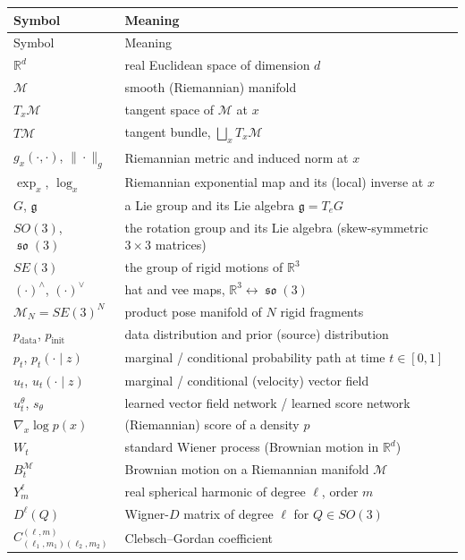 \documentclass[11pt,a4paper]{report}
\theoremstyle{definition}
\theoremstyle{remark}
\DeclareMathOperator{\so}{\mathfrak{so}}
\newcommand{\RR}{\mathbb R}
\begin{document}
\begin{center}
\begin{longtable}{p{3.6cm}p{10.5cm}}
\toprule
Symbol & Meaning \\
\midrule
\endfirsthead
\toprule
Symbol & Meaning \\
\midrule
\endhead
$\RR^d$ & real Euclidean space of dimension $d$ \\
$\mathcal M$ & smooth (Riemannian) manifold \\
$T_x\mathcal M$ & tangent space of $\mathcal M$ at $x$ \\
$T\mathcal M$ & tangent bundle, $\bigsqcup_{x} T_x\mathcal M$ \\
$g_x(\cdot,\cdot)$, $\|\cdot\|_g$ & Riemannian metric and induced norm at $x$ \\
$\exp_x$, $\log_x$ & Riemannian exponential map and its (local) inverse at $x$ \\
$G$, $\mathfrak g$ & a Lie group and its Lie algebra $\mathfrak g = T_eG$ \\
$SO(3)$, $\so(3)$ & the rotation group and its Lie algebra (skew-symmetric $3\times3$ matrices) \\
$SE(3)$ & the group of rigid motions of $\RR^3$ \\
$(\cdot)^{\wedge}$, $(\cdot)^{\vee}$ & hat and vee maps, $\RR^3 \leftrightarrow \so(3)$ \\
$\mathcal M_N = SE(3)^N$ & product pose manifold of $N$ rigid fragments \\
$p_{\mathrm{data}}$, $p_{\mathrm{init}}$ & data distribution and prior (source) distribution \\
$p_t$, $p_t(\cdot\mid z)$ & marginal / conditional probability path at time $t\in[0,1]$ \\
$u_t$, $u_t(\cdot\mid z)$ & marginal / conditional (velocity) vector field \\
$u_t^\theta$, $s_\theta$ & learned vector field network / learned score network \\
$\nabla_x \log p(x)$ & (Riemannian) score of a density $p$ \\
$W_t$ & standard Wiener process (Brownian motion in $\RR^d$) \\
$B_t^{\mathcal M}$ & Brownian motion on a Riemannian manifold $\mathcal M$ \\
$Y^{\ell}_m$ & real spherical harmonic of degree $\ell$, order $m$ \\
$D^{\ell}(Q)$ & Wigner-$D$ matrix of degree $\ell$ for $Q \in SO(3)$ \\
$C^{(\ell,m)}_{(\ell_1,m_1)(\ell_2,m_2)}$ & Clebsch--Gordan coefficient \\

\end{longtable}
\end{center}
\end{document}
